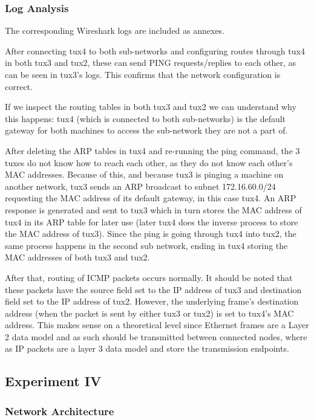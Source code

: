 \documentclass[11pt,a4paper,twocolumn]{article}
\begin{document}
\subsubsection{Log Analysis}

The corresponding Wireshark logs are included as annexes.

After connecting tux4 to both sub-networks and configuring routes through tux4 in both tux3 and tux2, these can send PING requests/replies to each other, as can be seen in tux3's logs. This confirms that the network configuration is correct.

If we inspect the routing tables in both tux3 and tux2 we can understand why this happens: tux4 (which is connected to both sub-networks) is the default gateway for both machines to access the sub-network they are not a part of.

After deleting the ARP tables in tux4 and re-running the ping command, the 3 tuxes do not know how to reach each other, as they do not know each other's MAC addresses.
Because of this, and because tux3 is pinging a machine on another network, tux3 sends an ARP broadcast to subnet 172.16.60.0/24 requesting the MAC address of its default gateway, in this case tux4.
An ARP response is generated and sent to tux3 which in turn stores the MAC address of tux4 in its ARP table for later use (later tux4 does the inverse process to store the MAC address of tux3).
Since the ping is going through tux4 into tux2, the same process happens in the second sub network, ending in tux4 storing the MAC addresses of both tux3 and tux2.

After that, routing of ICMP packets occurs normally. It should be noted that these packets have the source field set to the IP address of tux3 and destination field set to the IP address of tux2. However, the underlying frame's destination address (when the packet is sent by either tux3 or tux2) is set to tux4's MAC address.
This makes sense on a theoretical level since Ethernet frames are a Layer 2 data model and as such should be transmitted between connected nodes, where as IP packets are a layer 3 data model and store the transmission endpoints.

\subsection{Experiment IV}

\subsubsection{Network Architecture}
\end{document}
